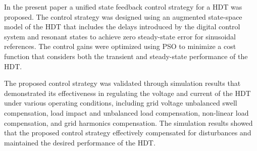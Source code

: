 In the present paper a unified state feedback control strategy for a HDT was proposed. The control strategy was designed using an augmented state-space model of the HDT that includes the delays introduced by the digital control system and resonant states to achieve zero steady-state error for sinusoidal references. The control gains were optimized using PSO to minimize a cost function that considers both the transient and steady-state performance of the HDT.

The proposed control strategy was validated through simulation results that demonstrated its effectiveness in regulating the voltage and current of the HDT under various operating conditions, including grid voltage unbalanced swell compensation, load impact and unbalanced load compensation, non-linear load compensation, and grid harmonics compensation. The simulation results showed that the proposed control strategy effectively compensated for disturbances and maintained the desired performance of the HDT.